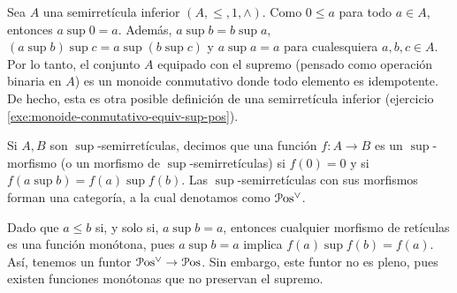 Sea $A$ una semirretícula inferior $(A,\leq, 1, \wedge)$.
Como $0\leq a$ para todo $a\in A$, entonces $a\sup 0=a$.
Además, $a\sup b=b\sup a$, $(a\sup b)\sup c=a\sup(b\sup c)$
y $a\sup a=a$ para cualesquiera $a,b,c\in A$.
Por lo tanto, el conjunto $A$ equipado con el supremo (pensado
como operación binaria en $A$) es un monoide
conmutativo donde todo elemento es idempotente.
De hecho, esta es otra posible definición de una semirretícula
inferior (ejercicio \ref{exe:monoide-conmutativo-equiv-sup-pos}).
\iffalse
Recíprocamente, si $(A,\sup,0)$ es un monoide conmutativo
en el cual todo elemento es idempotente,
entonces la relación definida como
\[
  a\leq b \ssi a\sup b=b
\]
es un orden parcial en $A$ tal que el supremo es $\sup$.

\begin{proof}
    En efecto, esto es un orden parcial:
    \begin{itemize}
        \item (Refl). Como $a$ es idempotente, tenemos $a\sup a=a$.
        Luego, $a\leq a$.
        \item (Antisim). Supongamos que $a\leq b$ y $b\leq a$.
        Es decir, $a\sup b=b$ y $b\sup a=a$.
        Como $\sup$ es conmutativo, tenemos
        \[
            b = a\sup b = b\sup a = a
        .\]
        \item (Trans). Supongamos que $a\leq b$ y que $b\leq c$.
        Es decir, $a\sup b = b$ y $b\sup c = c$.
        Como $\sup$ es asociativo, tenemos
        \[
            a\sup c = a\sup(b\sup c) = (a\sup b)\sup c = b\sup c = c
        .\]
        Esto es, $a\leq c$.
    \end{itemize}
    Ahora mostraremos que $\sup$ es el supremo de este orden.
    Por inducción, basta mostrarlo en el vacío y en
    pares de elementos.
    Como $0\sup a=a$, entonces $0\leq a$ para todo $a\in A$.
    Ahora sean $a,b\in A$, y supongamos que $c\in A$ es tal que
    $a,b\leq c$.
    Esto es, $a\sup c = c$ y $b\sup c = c$.
    Luego,
    \[
        (a\sup b)\sup c = (a\sup c)\sup(b\sup c) = c\sup c = c
    .\]
    Por lo tanto, $a\sup b\leq c$.
\end{proof}
\fi

Si $A,B$ son $\sup$-semirretículas,
decimos que una función $f:A\to B$ es
un $\sup$-morfismo (o un morfismo de $\sup$-semirretículas)
si $f(0)=0$ y si $f(a\sup b)=f(a)\sup f(b)$.
Las $\sup$-semirretículas con sus morfismos forman una
categoría, a la cual denotamos como $\mathcal{P}\mathrm{os}^\vee$.

Dado que $a\leq b$ si, y solo si, $a\sup b=a$, entonces
cualquier morfismo de retículas es una función monótona,
pues $a\sup b=a$ implica $f(a)\sup f(b)=f(a)$.
Así, tenemos un funtor $\mathcal{P}\mathrm{os}^\vee\to\mathcal{P}\mathrm{os}$. Sin embargo, este
funtor no es pleno, pues existen funciones monótonas que no
preservan el supremo.

